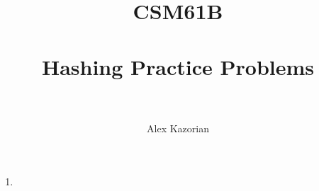 \documentclass{article}
\title{
	\normalfont \normalsize
	\textsc{CSM61B} \\ [25pt] %
	\horrule{0.5pt} \\[0.4cm] %
	\huge Hashing Practice Problems \\ %
	\horrule{2pt} \\[0.5cm] %
}
\author{Alex Kazorian} %
\newenvironment{Questions}[1][Question]
{\begin{enumerate}}
	{\end{enumerate}}
\begin{document}
	\maketitle
	\begin{Questions}
		\item


	\end{Questions}
\end{document}
